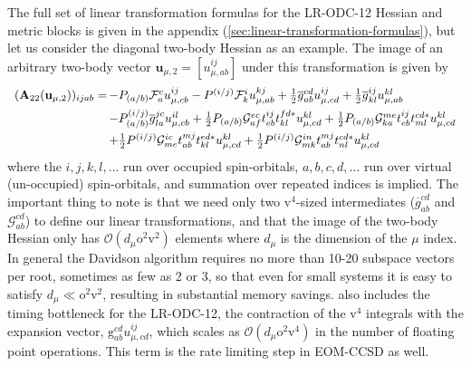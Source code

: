 The full set of linear transformation formulas for the LR-ODC-12 Hessian and
metric blocks is given in the appendix
(\cref{sec:linear-transformation-formulas}), but let us consider the diagonal
two-body Hessian as an example.
The image of an arbitrary two-body vector
\(
    \mathbf{u}_{\mu,2}
    =
    [u_{\mu,ab}^{ij}]
\)
under this transformation is given by
\begin{equation}
    \label{eq:two-body-hessian-function-in-text}
    \begin{array}{r@{\,}l}
        (\mathbf{A}_{22}(\mathbf{u}_{\mu,2}))_{ijab}
        =
        &
        -
        P_{(a/b)}
        \mathcal{F}_a^c
        u_{\mu,cb}^{ij}
        -
        P^{(i/j)}
        \mathcal{F}_k^i
        u_{\mu,ab}^{kj}
        +
        \tfrac{1}{2}
        \overline{g}_{ab}^{cd}
        u_{\mu,cd}^{ij}
        +
        \tfrac{1}{2}
        \overline{g}_{kl}^{ij}
        u_{\mu,ab}^{kl}
        \\[5pt]
        &
        -
        P_{(a/b)}^{(i/j)}
        \overline{g}_{la}^{jc}
        u_{\mu,cb}^{il}
        +
        \tfrac{1}{2}
        P_{(a/b)}
        \mathcal{G}_{af}^{ec}
        t_{eb}^{ij}
        t_{kl}^{fd*}
        u_{\mu,cd}^{kl}
        +
        \tfrac{1}{2}
        P_{(a/b)}
        \mathcal{G}_{ka}^{me}
        t_{eb}^{ij}
        t_{ml}^{cd*}
        u_{\mu,cd}^{kl}
        \\[5pt]
        &
        +
        \tfrac{1}{2}
        P^{(i/j)}
        \mathcal{G}_{me}^{ic}
        t_{ab}^{mj}
        t_{kl}^{ed*}
        u_{\mu,cd}^{kl}
        +
        \tfrac{1}{2}
        P^{(i/j)}
        \mathcal{G}_{mk}^{in}
        t_{ab}^{mj}
        t_{nl}^{cd*}
        u_{\mu,cd}^{kl}
    \end{array}
\end{equation}
where the \(i,j,k,l,\ldots\) run over occupied spin-orbitals, \(a,b,c,d,\ldots\)
run over virtual (un-occupied) spin-orbitals, and summation over repeated
indices is implied.
The important thing to note is that we need only two \(\mathrm{v}^4\)-sized
intermediates (\(\overline{g}_{ab}^{cd}\) and \(\mathcal{G}_{ab}^{cd}\)) to
define our linear transformations, and that the image of the two-body Hessian
only has \(\mathcal{O}(d_\mu\mathrm{o}^2\mathrm{v}^2)\) elements where \(d_\mu\)
is the dimension of the \(\mu\) index.
In general the Davidson algorithm requires no more than 10-20 subspace vectors
per root, sometimes as few as 2 or 3, so that even for small systems it is easy
to satisfy \( d_\mu \ll \mathrm{o}^2\mathrm{v}^2 \), resulting in substantial
memory savings.
 also includes the timing bottleneck
for the LR-ODC-12, the contraction of the \(\mathrm{v}^4\) integrals with the
expansion vector, \(\mathrm{g}_{ab}^{cd}u_{\mu,cd}^{ij}\), which scales as
\(\mathcal{O}(d_\mu\mathrm{o}^2\mathrm{v}^4)\) in the number of floating point
operations.
This term is the rate limiting step in EOM-CCSD as well.

